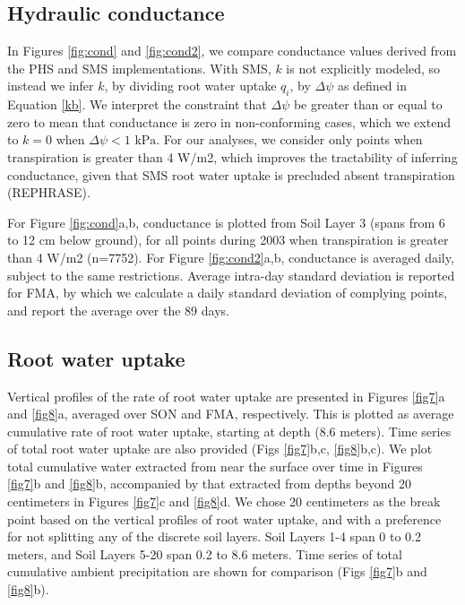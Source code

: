 \documentclass[draft,linenumbers]{agujournal}
\begin{document}
    
\subsection{Hydraulic conductance}
    In Figures \ref{fig:cond} and \ref{fig:cond2}, we compare conductance values derived from the PHS and SMS implementations.
    With SMS, $k$ is not explicitly modeled, so instead we infer $k$, 
    by dividing root water uptake $q_i$, by $\Delta\psi$ as defined in Equation \ref{kb}.
    We interpret the constraint that $\Delta\psi$ be greater than or equal to zero to mean 
    that conductance is zero in non-conforming cases, which we extend to $k=0$ when $\Delta\psi<\text{1 kPa}$.
    For our analyses, we consider only points when transpiration is greater than 4 W/m2, which improves the tractability of inferring conductance,
    given that SMS root water uptake is precluded absent transpiration (REPHRASE). 
    
    For Figure \ref{fig:cond}a,b, conductance is plotted from Soil Layer 3 (spans from 6 to 12 cm below ground),
     for all points during 2003 when transpiration is greater than 4 W/m2 (n=7752).
    For Figure \ref{fig:cond2}a,b, conductance is averaged daily, subject to the same restrictions.
    Average intra-day standard deviation is reported for FMA, by which we calculate a daily standard deviation of complying points, and report the average over the 89 days.


\subsection{Root water uptake}
    Vertical profiles of the rate of root water uptake are presented in Figures \ref{fig7}a and \ref{fig8}a, averaged over SON and FMA, respectively.
    This is plotted as average cumulative rate of root water uptake, starting at depth (8.6 meters).
    Time series of total root water uptake are also provided (Figs \ref{fig7}b,c, \ref{fig8}b,c).
    We plot total cumulative water extracted from near the surface over time in Figures \ref{fig7}b and \ref{fig8}b, 
    accompanied by that extracted from depths beyond 20 centimeters in Figures \ref{fig7}c and \ref{fig8}d.
    We chose 20 centimeters as the break point based on the vertical profiles of root water uptake, and with a preference for not splitting any of the discrete soil layers.
    Soil Layers 1-4 span 0 to 0.2 meters, and Soil Layers 5-20 span 0.2 to 8.6 meters.
    Time series of total cumulative ambient precipitation are shown for comparison (Figs \ref{fig7}b and \ref{fig8}b).
    
\end{document}
